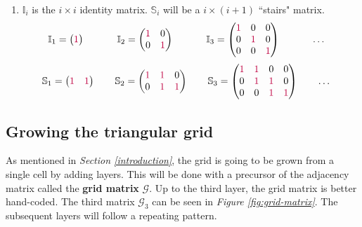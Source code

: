 \documentclass{article}
\begin{document}
\begin{enumerate}
\item 
$\mathbb{I}_i$ is the $i\times i$ identity matrix. $\mathbb{S}_i$ will be a $i\times (i+1)$ ``stairs" matrix.
\begin{equation}
    \mathbb{I}_1=
    \begin{pmatrix}
    {\color{purple}1}
    \end{pmatrix}
\qquad\quad\;
    \mathbb{I}_2=
    \begin{pmatrix}
    {\color{purple}1} & 0 \\
    0 & {\color{purple}1}
    \end{pmatrix}
\qquad\quad\;
    \mathbb{I}_3=
    \begin{pmatrix}
    {\color{purple}1} & 0 & 0 \\
    0 & {\color{purple}1} & 0 \\
    0 & 0 & {\color{purple}1} 
    \end{pmatrix}
\qquad\quad\;
    \hdots
\quad
\end{equation}
\begin{equation}
    \mathbb{S}_1=
    \begin{pmatrix}
    {\color{purple}1} & {\color{purple}1}
    \end{pmatrix}
\qquad
    \mathbb{S}_2=
    \begin{pmatrix}
    {\color{purple}1} & {\color{purple}1} & 0 \\
    0 & {\color{purple}1} & {\color{purple}1} 
    \end{pmatrix}
\qquad
    \mathbb{S}_3=
    \begin{pmatrix}
    {\color{purple}1} & {\color{purple}1} & 0 & 0 \\
    0 & {\color{purple}1} & {\color{purple}1} & 0 \\
    0 & 0 & {\color{purple}1} & {\color{purple}1} 
    \end{pmatrix}
\qquad
    \hdots
\quad
\end{equation}

\end{enumerate}

\subsection{Growing the triangular grid} \label{growing-the-grid}

As mentioned in \textit{Section \ref{introduction}}, the grid is going to be grown from a single cell by adding layers. This will be done with a precursor of the adjacency matrix called the \textbf{grid matrix} $\mathcal{G}$. Up to the third layer, the grid matrix is better hand-coded. The third matrix $\mathcal{G}_3$ can be seen in \textit{Figure \ref{fig:grid-matrix}}. The subsequent layers will follow a repeating pattern.
\end{document}
